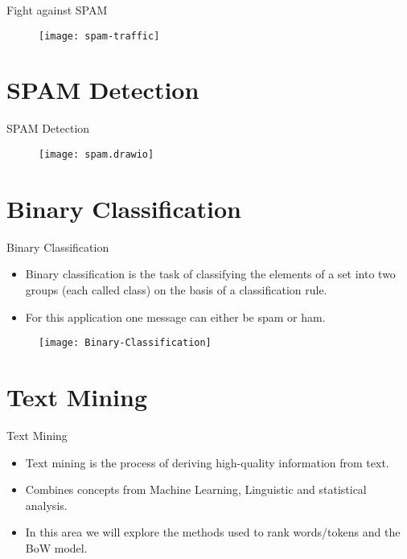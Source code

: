 \documentclass[hyperref={hidelinks}]{beamer}
\begin{document}
  \begin{frame}{Fight against SPAM}
    \begin{figure}
    \centering
    \texttt{[image: spam-traffic]}
    \end{figure}
  \end{frame}

  \section{SPAM Detection}
  \begin{frame}{SPAM Detection}
    \begin{figure}
    \centering
    \texttt{[image: spam.drawio]}
    \end{figure}
  \end{frame}

  \section{Binary Classification}
  \begin{frame}{Binary Classification}
    \begin{itemize}
      \item Binary classification is the task of classifying the elements of a set into two groups (each called class) on the basis of a classification rule.
      \item For this application one message can either be spam or ham.
    \end{itemize}
    \begin{figure}
    \centering
    \texttt{[image: Binary-Classification]}
    \end{figure}
  \end{frame}

  \section{Text Mining}
  \begin{frame}{Text Mining}
    \begin{itemize}
      \item Text mining is the process of deriving high-quality information from text.
      \item Combines concepts from Machine Learning, Linguistic and statistical analysis.
      \item In this area we will explore the methods used to rank words\slash tokens and the BoW model.
    \end{itemize}
  \end{frame}
\end{document}
